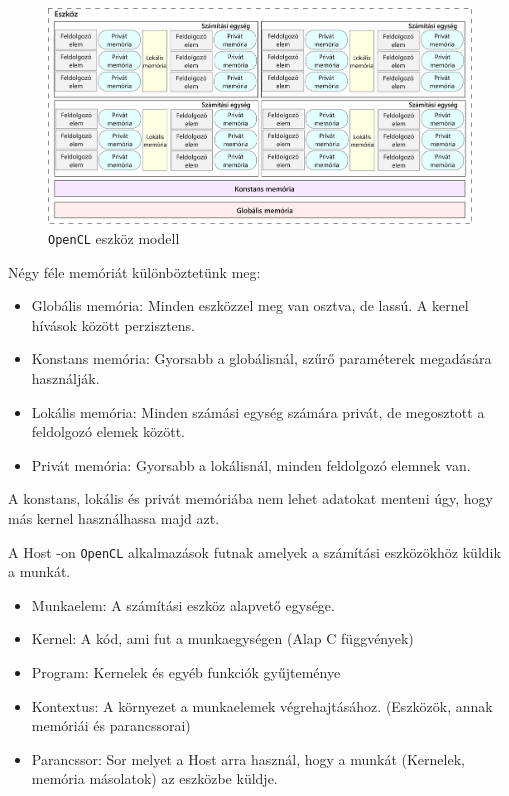 
\begin{figure}[h!]
\centering
\includegraphics[width=\textwidth]{images/device.png}
\caption{\texttt{OpenCL} eszköz modell}
\label{fig:opencl}
\end{figure}

Négy féle memóriát különböztetünk meg:
\begin{itemize}
\item Globális memória: Minden eszközzel meg van osztva, de lassú. A kernel hívások között perzisztens. 
\item Konstans memória: Gyorsabb a globálisnál, szűrő paraméterek megadására használják.
\item Lokális memória: Minden számási egység számára privát, de megosztott a feldolgozó elemek között.
\item Privát memória: Gyorsabb a lokálisnál, minden feldolgozó elemnek van.
\end{itemize} 
A konstans, lokális és privát memóriába nem lehet adatokat menteni úgy, hogy más kernel használhassa majd azt.


A Host -on \texttt{OpenCL} alkalmazások futnak amelyek a számítási eszközökhöz küldik a munkát.
\begin{itemize}
\item Munkaelem: A számítási eszköz alapvető egysége.
\item Kernel: A kód, ami fut a munkaegységen  (Alap C függvények)
\item Program: Kernelek és egyéb funkciók gyűjteménye
\item Kontextus: A környezet a munkaelemek végrehajtásához. (Eszközök, annak memóriái és parancssorai)
\item Parancssor: Sor melyet a Host arra használ, hogy a munkát (Kernelek, memória másolatok) az eszközbe küldje.
\end{itemize}

